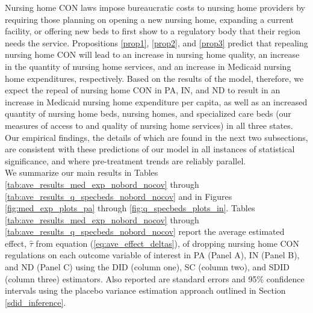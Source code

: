 \documentclass[../Main.tex]{subfiles}
\begin{document}
Nursing home CON laws impose bureaucratic costs to nursing home providers by requiring those planning on opening a new nursing home, expanding a current facility, or offering new beds to first show to a regulatory body that their region needs the service. Propositions \ref{prop1}, \ref{prop2}, and \ref{prop3} predict that repealing nursing home CON will lead to an increase in nursing home quality, an increase in the quantity of nursing home services, and an increase in Medicaid nursing home expenditures, respectively. Based on the results of the model, therefore, we expect the repeal of nursing home CON in PA, IN, and ND to result in an increase in Medicaid nursing home expenditure per capita, as well as an increased quantity of nursing home beds, nursing homes, and specialized care beds (our measures of access to and quality of nursing home services) in all three states. Our empirical findings, the details of which are found in the next two subsections, are consistent with these predictions of our model in all instances of statistical significance, and where pre-treatment trends are reliably parallel.\\
\indent We summarize our main results in Tables \ref{tab:ave_results_med_exp_nobord_nocov} through \ref{tab:ave_results_q_specbeds_nobord_nocov} and in Figures \ref{fig:med_exp_plots_pa} through \ref{fig:q_specbeds_plots_in}. Tables \ref{tab:ave_results_med_exp_nobord_nocov} through \ref{tab:ave_results_q_specbeds_nobord_nocov} report the average estimated effect, $\hat{\tau}$ from equation (\ref{eq:ave_effect_deltas}), of dropping nursing home CON regulations on each outcome variable of interest in PA (Panel A), IN (Panel B), and ND (Panel C) using the DID (column one), SC (column two), and SDID (column three) estimators. Also reported are standard errors and 95\% confidence intervals using the placebo variance estimation approach outlined in Section \ref{sdid_inference}.\\
\end{document}
